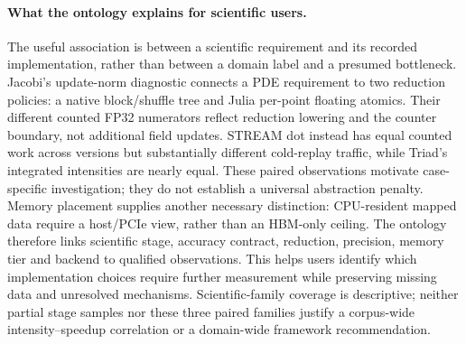 \paragraph{What the ontology explains for scientific users.}
The useful association is between a scientific requirement and its recorded implementation, rather than between a domain label and a presumed bottleneck. Jacobi's update-norm diagnostic connects a PDE requirement to two reduction policies: a native block/shuffle tree and Julia per-point floating atomics. Their different counted FP32 numerators reflect reduction lowering and the counter boundary, not additional field updates. STREAM dot instead has equal counted work across versions but substantially different cold-replay traffic, while Triad's integrated intensities are nearly equal. These paired observations motivate case-specific investigation; they do not establish a universal abstraction penalty. Memory placement supplies another necessary distinction: CPU-resident mapped data require a host/PCIe view, rather than an HBM-only ceiling. The ontology therefore links scientific stage, accuracy contract, reduction, precision, memory tier and backend to qualified observations. This helps users identify which implementation choices require further measurement while preserving missing data and unresolved mechanisms. Scientific-family coverage is descriptive; neither partial stage samples nor these three paired families justify a corpus-wide intensity--speedup correlation or a domain-wide framework recommendation.
